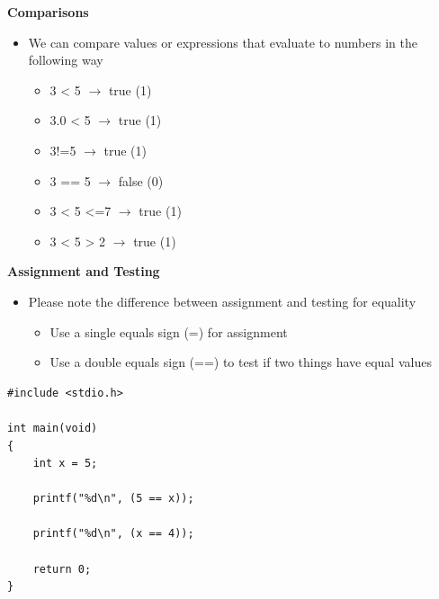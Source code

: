 \documentclass{beamer}
\begin{document}
\begin{frame}

 
\textbf{Comparisons}
 
\begin{itemize}
\item We can compare values or expressions that evaluate to numbers in the following way
\begin{itemize}
\item 3 {\textless} 5 $\rightarrow $ true (1)
\item 3.0 {\textless} 5 $\rightarrow $ true (1)
\item 3!=5 $\rightarrow $ true (1)
\item 3 == 5 $\rightarrow $ false (0)
\item 3 {\textless} 5 {\textless}=7 $\rightarrow $ true (1)
\item 3 {\textless} 5 {\textgreater} 2 $\rightarrow $ true (1)
\end{itemize}
\end{itemize}
\end{frame}

\begin{frame}[fragile]
\textbf{Assignment and Testing}
\begin{itemize}
\item Please note the difference between assignment and testing for equality
\begin{itemize}
\item Use a single equals sign (=) for assignment
\item Use a double equals sign (==) to test if two things have equal values 
\end{itemize}
\end{itemize}
\end{frame}

\begin{frame}[fragile]
\begin{block}{}
\begin{lstlisting}
#include <stdio.h>

int main(void) 
{
    int x = 5;
    
    printf("%d\n", (5 == x));
    
    printf("%d\n", (x == 4));
    
    return 0;
}
\end{lstlisting}
\end{block}
\end{frame}
\end{document}
